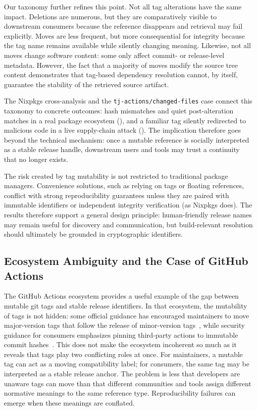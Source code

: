 Our taxonomy further refines this point.
Not all tag alterations have the same impact.
Deletions are numerous, but they are comparatively visible to downstream consumers because the reference disappears and retrieval may fail explicitly.
Moves are less frequent, but more consequential for integrity because the tag name remains available while silently changing meaning.
Likewise, not all moves change software content: some only affect commit- or release-level metadata.
However, the fact that a majority of moves modify the source tree content demonstrates that tag-based dependency resolution cannot, by itself, guarantee the stability of the retrieved source artifact.

The Nixpkgs cross-analysis and the \texttt{tj-actions/changed-files} case connect this taxonomy to concrete outcomes: hash mismatches and quiet post-alteration matches in a real package ecosystem (), and a familiar tag silently redirected to malicious code in a live supply-chain attack ().
The implication therefore goes beyond the technical mechanism: once a mutable reference is socially interpreted as a stable release handle, downstream users and tools may trust a continuity that no longer exists.

The risk created by tag mutability is not restricted to traditional package managers.
Convenience solutions, such as relying on tags or floating references, conflict with strong reproducibility guarantees unless they are paired with immutable identifiers or independent integrity verification (as Nixpkgs does).
The results therefore support a general design principle: human-friendly release names may remain useful for discovery and communication, but build-relevant resolution should ultimately be grounded in cryptographic identifiers.

\subsection{Ecosystem Ambiguity and the Case of GitHub Actions}
\label{subsec:tags-disc-github-actions}

The GitHub Actions ecosystem provides a useful example of the gap between mutable git tags and stable release identifiers.
In that ecosystem, the mutability of tags is not hidden: some official guidance has encouraged maintainers to move major-version tags that follow the release of minor-version tags~\cite{github_actions_versioning_recommendations}, while security guidance for consumers emphasizes pinning third-party actions to immutable commit hashes~\cite{github_secure_use_third_party_actions}.
This does not make the ecosystem incoherent so much as it reveals that tags play two conflicting roles at once.
For maintainers, a mutable tag can act as a moving compatibility label; for consumers, the same tag may be interpreted as a stable release anchor.
The problem is less that developers are unaware tags can move than that different communities and tools assign different normative meanings to the same reference type.
Reproducibility failures can emerge when these meanings are conflated.

